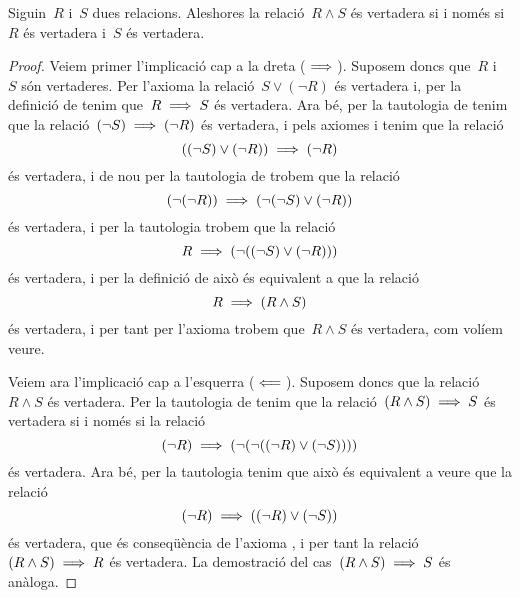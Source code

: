 \documentclass[../../main.tex]{subfiles}
\begin{document}
    \begin{tautology}
        \label{taut:condició equivalent a conjunció}
        Siguin~\(R\) i~\(S\) dues relacions.
        Aleshores la relació~\(R\land S\) és vertadera si i només si~\(R\) és vertadera i~\(S\) és vertadera.
        \begin{proof}
            Veiem primer l'implicació cap a la dreta (\(\implies\)).
            Suposem doncs que~\(R\) i~\(S\) són vertaderes.
            Per l'axioma  la relació~\(S\lor(\lnot R)\) és vertadera i, per la definició de  tenim que~\(R\implies S\) és vertadera.
            Ara bé, per la tautologia de  tenim que la relació~\((\lnot S)\implies(\lnot R)\) és vertadera, i pels axiomes  i  tenim que la relació
            \[
                ((\lnot S)\lor(\lnot R))\implies(\lnot R)
            \]
            és vertadera, i de nou per la tautologia de  trobem que la relació
            \[
                (\lnot(\lnot R))\implies(\lnot(\lnot S)\lor(\lnot R))
            \]
            és vertadera, i per la tautologia  trobem que la relació
            \[
                R\implies(\lnot((\lnot S)\lor(\lnot R)))
            \]
            és vertadera, i per la definició de  això és equivalent a que la relació
            \[
                R\implies(R\land S)
            \]
            és vertadera, i per tant per l'axioma  trobem que~\(R\land S\) és vertadera, com volíem veure.

            Veiem ara l'implicació cap a l'esquerra (\(\impliedby\)).
            Suposem doncs que la relació~\(R\land S\) és vertadera.
            Per la tautologia de  tenim que la relació~\((R\land S)\implies S\) és vertadera si i només si la relació
            \[
                (\lnot R)\implies(\lnot(\lnot((\lnot R)\lor(\lnot S))))
            \]
            és vertadera.
            Ara bé, per la tautologia  tenim que això és equivalent a veure que la relació
            \[
                (\lnot R)\implies((\lnot R)\lor(\lnot S))
            \]
            és vertadera, que és conseqüència de l'axioma , i per tant la relació~\((R\land S)\implies R\) és vertadera.
            La demostració del cas~\((R\land S)\implies S\) és anàloga.
        \end{proof}
    \end{tautology}
\end{document}
